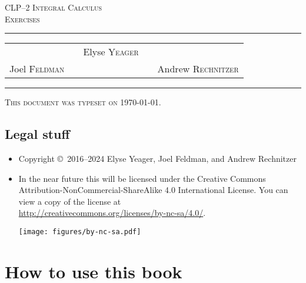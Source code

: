 \documentclass[12pt,letterpaper, openany]{book}
\begin{document}
\setcounter{page}{0}


\begin{titlepage}
\begin{center}
\textsc{\LARGE
CLP--2 Integral Calculus \\[2ex]
Exercises
}\\[2ex]

\vspace{5ex}
\hrule
\vspace{5ex}

\begin{tabular}{lcccr}
&& \large Elyse \textsc{Yeager} \\[3ex]
 Joel \textsc{Feldman}
&\quad & &\quad&
Andrew \textsc{Rechnitzer}
\end{tabular}

\end{center}
\vspace{2ex}
\hrule

\vfill
\textsc{This document was typeset on \today.}
\end{titlepage}

\section*{Legal stuff}
\begin{itemize}
 \item Copyright \copyright\ 2016--2024 Elyse Yeager,  Joel Feldman,
and Andrew  Rechnitzer

\item In the near future this will be licensed under the
Creative Commons Attribution-NonCommercial-ShareAlike 4.0 International
License. You can view a copy of the license at \\
\url{http://creativecommons.org/licenses/by-nc-sa/4.0/}.
\begin{center}
 \texttt{[image: figures/by-nc-sa.pdf]}
\end{center}
\end{itemize}

\newpage

\frontmatter

\chapter{How to use this book}


\tableofcontents
\end{document}
